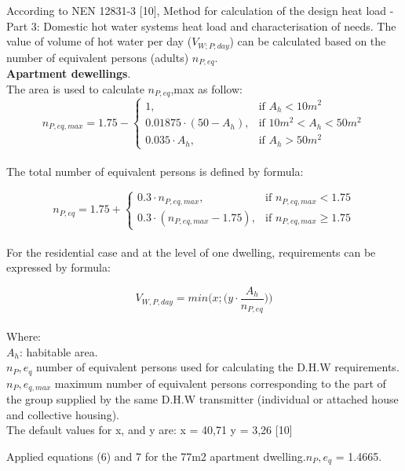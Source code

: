 \documentclass[a4paper,10pt]{article}
\begin{document}
According to NEN 12831-3 [10], Method for calculation of the design heat load - Part 3:  Domestic hot water systems heat load and characterisation of needs. The value of volume of hot water per day ($V_{W;P;day}$) can be calculated based on the number of equivalent persons (adults) $n_{P,eq}$.
\vspace{2mm}
\\
\textbf{Apartment dewellings}.\\
The area is used to calculate $n_{P,eq}$,max as follow: 
\begin{equation}
    n_{P,eq,max}= 1.75 - \begin{cases}
			1, & \text{if $A_{h} < 10 m^2$}\\
            0.01875\cdot(50 - A_h), & \text{if $10 m^2 <A_{h} < 50 m^2$}\\
            0.035\cdot A_h, & \text{if $A_{h} > 50 m^2$}
		 \end{cases}
\end{equation}\\
The total number of equivalent persons is defined by formula:


\begin{equation}
    n_{P,eq}= 1.75 + \begin{cases}
			0.3\cdot n_{P,eq,max}, & \text{if $n_{P,eq,max} < 1.75$}\\
            0.3\cdot(n_{P,eq,max}- 1.75), & \text{if $n_{P,eq,max} \geq 1.75$}
		 \end{cases}
\end{equation}\\
For the residential case and at the level of one dwelling, requirements can be expressed by formula:


\begin{equation}
   V_{W,P,day} = min\Big(x;\Big(y\cdot \frac{A_h}{n_{P,eq}}\Big)\Big)
\end{equation}\\
Where:\\ 
$A_{h}$: habitable area.\\
$n_{P},e_{q}$ number of equivalent persons used for calculating the D.H.W requirements.\\
$n_{P},e_{q,max}$ maximum number of equivalent persons corresponding to the part of the group supplied by the same D.H.W transmitter (individual or attached house and collective housing).\\
The default values for x, and y are:
x = 40,71
y = 3,26 [10]

Applied equations (6) and 7 for the 77m2 apartment dwelling.$n_{P},e_{q}$ = 1.4665.
\end{document}

